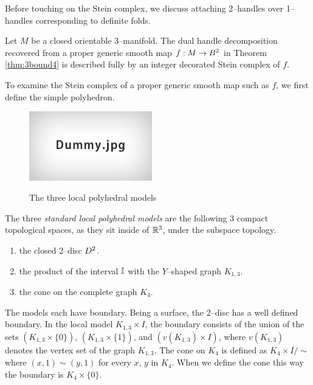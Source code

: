 \begin{rmk}
	\label{rmk:definitehandles}
	Before touching on the Stein complex, we discuss attaching 2--handles over 1--handles corresponding to definite folds.
\end{rmk}


\begin{theorem}
	\label{thm:3stein4}
	Let $M$ be a closed orientable 3--manifold.
	The dual handle decomposition recovered from a proper generic smooth map $f:M\to B^2$ in Theorem \ref{thm:3bound4} is described fully by an integer decorated Stein complex of $f$.
\end{theorem}

To examine the Stein complex of a proper generic smooth map such as $f$, we first define the simple polyhedron.

\begin{defn}
	\begin{figure}
		\centering
		\caption{The three local polyhedral models}
		\includegraphics[height=3cm]{figures/dummy.jpg}
		\label{fig:localpoly}
	\end{figure}
	The three \emph{standard local polyhedral models} are the following 3 compact topological spaces, as they sit inside of $\mathbb{R}^3$, under the subspace topology.
	\begin{enumerate}
		\item the closed 2--disc $D^2$.
		\item the product of the interval $\mathbb{I}$ with the $Y$--shaped graph $K_{1,3}$.
		\item the cone on the complete graph $K_4$.
	\end{enumerate}
	The models each have boundary.
	Being a surface, the 2--disc has a well defined boundary.
	In the local model $K_{1,3}\times I$, the boundary consists of the union of the sets $(K_{1,3}\times \{0\})$, $(K_{1,3}\times \{1\})$, and $(v(K_{1,3})\times I)$, where $v(K_{1,3})$ denotes the vertex set of the graph $K_{1,3}$.
	The cone on $K_4$ is defined as $K_4\times I /\sim$ where $(x,1)\sim (y,1)$ for every $x$, $y$ in $K_4$.
	When we define the cone this way the boundary is $K_4\times \{0\}$.
\end{defn}

